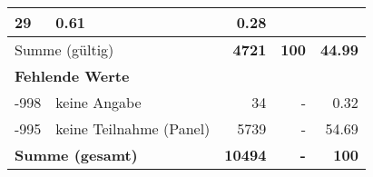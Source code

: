 \begin{longtable}{lXrrr}
       \num{29} &
       \num[round-mode=places,round-precision=2]{0,61} &
         \num[round-mode=places,round-precision=2]{0,28} \\
     \midrule
     \multicolumn{2}{l}{Summe (gültig)} &
       \textbf{\num{4721}} &
     \textbf{100} &
       \textbf{\num[round-mode=places,round-precision=2]{44,99}} \\
     \multicolumn{5}{l}{\textbf{Fehlende Werte}}\\
       -998 &
       keine Angabe &
         \num{34} &
        - &
         \num[round-mode=places,round-precision=2]{0,32} \\
       -995 &
       keine Teilnahme (Panel) &
         \num{5739} &
        - &
         \num[round-mode=places,round-precision=2]{54,69} \\
     \midrule
     \multicolumn{2}{l}{\textbf{Summe (gesamt)}} &
          \textbf{\num{10494}} &
        \textbf{-} &
        \textbf{100} \\
     \bottomrule
     \end{longtable}
     
